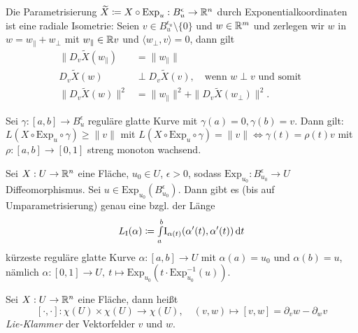 \documentclass{cheat-sheet}
\newcommand{\I}{\mathrm{I}}
\newcommand{\Exp}{\mathrm{Exp}} %
\begin{document}
\begin{satz}[Gaußlemma]
  Die Parametrisierung $\widetilde{X} \coloneqq X \circ \Exp_u : B_u^\epsilon \to \R^n$ durch Exponentialkoordinaten ist eine radiale Isometrie: Seien $v \in B_u^{\epsilon_u} \setminus \{0\}$ und $w \in \mathbb{R}^m$ und zerlegen wir $w$ in $w = w_{\|} + w_\perp$ mit $w_{\|} \in \mathbb{R} v$ und $\langle w_\perp, v \rangle = 0$, dann gilt
  \begin{align*}
    \| D_v \widetilde{X}(w_{\|}) &= \| w_{\|} \|\\
    D_v \widetilde{X}(w) &\perp D_v \widetilde{X}(v), \quad \text{wenn $w \perp v$  und somit }\\
    \| D_v \widetilde{X}(w) \|^2 &= \| w_{\|} \|^2 + \| D_v \widetilde{X}(w_{\perp}) \|^2.
  \end{align*}
\end{satz}

\begin{satz}
  Sei $\gamma : [a, b] \to B_u^\epsilon$ reguläre glatte Kurve mit $\gamma(a) = 0, \gamma(b) = v$. Dann gilt: $L(X \circ \Exp_u \circ \gamma) \geq \|v\|$ mit $L(X \circ \Exp_u \circ \gamma) = \|v\| \iff \gamma(t) = \rho(t)v$ mit $\rho : [a, b] \to [0, 1]$ streng monoton wachsend.
\end{satz}

\begin{satz}
  Sei $X : U \to \mathbb{R}^n$ eine Fläche, $u_0 \in U$, $\epsilon > 0$, sodass $\Exp_{u_0} : B_{u_0}^{\epsilon} \to U$ Diffeomorphismus. Sei $u \in \Exp_{u_0}(B_{u_0}^{\epsilon})$. Dann gibt es (bis auf Umparametrisierung) genau eine bzgl. der Länge
  \[ L_\I(\alpha) \coloneqq \Int{a}{b}{\I_{\alpha(t)}(\alpha'(t), \alpha'(t))}{t} \]
  kürzeste reguläre glatte Kurve $\alpha : [a, b] \to U$ mit $\alpha(a) = u_0$ und $\alpha(b) = u$, nämlich $\alpha : [0, 1] \to U, \  t \mapsto \Exp_{u_0}(t \cdot \Exp_{u_0}^{-1}(u))$.
\end{satz}



\begin{definition}
  Sei $X : U \to \mathbb{R}^n$ eine Fläche, dann heißt
  \[
    [\cdot,\cdot] : \chi(U) \times \chi(U) \to \chi(U), \quad
    (v, w) \mapsto [v, w] = \partial_v w - \partial_w v
  \]
  \emph{Lie-Klammer} der Vektorfelder $v$ und $w$.
\end{definition}
\end{document}
